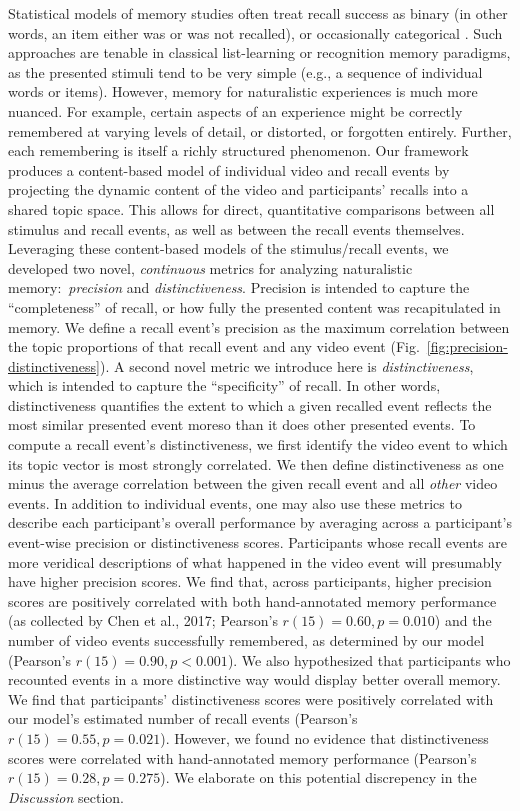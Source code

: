 \documentclass{article}
\begin{document}
Statistical models of memory studies often treat recall success as binary (in other words, an item either was or was not recalled), or occasionally categorical \citep[e.g., to distinguish familiarity from recollection;][]{YoneEtal02}.  Such approaches are tenable in classical list-learning or recognition memory paradigms, as the presented stimuli tend to be very simple (e.g., a sequence of individual words or items).  However, memory for naturalistic experiences is much more nuanced.  For example, certain aspects of an experience might be correctly remembered at varying levels of detail, or distorted, or forgotten entirely.  Further, each remembering is itself a richly structured phenomenon.  Our framework produces a content-based model of individual video and recall events by projecting the dynamic content of the video and participants' recalls into a shared topic space.  This allows for direct, quantitative comparisons between all stimulus and recall events, as well as between the recall events themselves.  Leveraging these content-based models of the stimulus/recall events, we developed two novel, \textit{continuous} metrics for analyzing naturalistic memory:~\textit{precision} and \textit{distinctiveness}.  Precision is intended to capture the ``completeness'' of recall, or how fully the presented content was recapitulated in memory.  We define a recall event's precision as the maximum correlation between the topic proportions of that recall event and any video event (Fig.~\ref{fig:precision-distinctiveness}).  A second novel metric we introduce here is \textit{distinctiveness}, which is intended to capture the ``specificity'' of recall.  In other words, distinctiveness quantifies the extent to which a given recalled event reflects the most similar presented event moreso than it does other presented events.  To compute a recall event's distinctiveness, we first identify the video event to which its topic vector is most strongly correlated.  We then define distinctiveness as one minus the average correlation between the given recall event and all \textit{other} video events.  In addition to individual events, one may also use these metrics to describe each participant's overall performance by averaging across a participant's event-wise precision or distinctiveness scores.  Participants whose recall events are more veridical descriptions of what happened in the video event will presumably have higher precision scores. We find that, across participants, higher precision scores are positively correlated with both hand-annotated memory performance (as collected by Chen et al., 2017; Pearson's $r(15) = 0.60, p = 0.010$) and the number of video events successfully remembered, as determined by our model (Pearson's $r(15) = 0.90, p < 0.001$).  We also hypothesized that participants who recounted events in a more distinctive way would display better overall memory.  We find that participants' distinctiveness scores were positively
correlated with our model's estimated number of recall events (Pearson's $r(15) = 0.55, p = 0.021$).  However, we found no evidence that distinctiveness scores were correlated with hand-annotated memory performance (Pearson's $r(15) = 0.28, p = 0.275$).  We elaborate on this potential discrepency in the \textit{Discussion} section.
\end{document}
